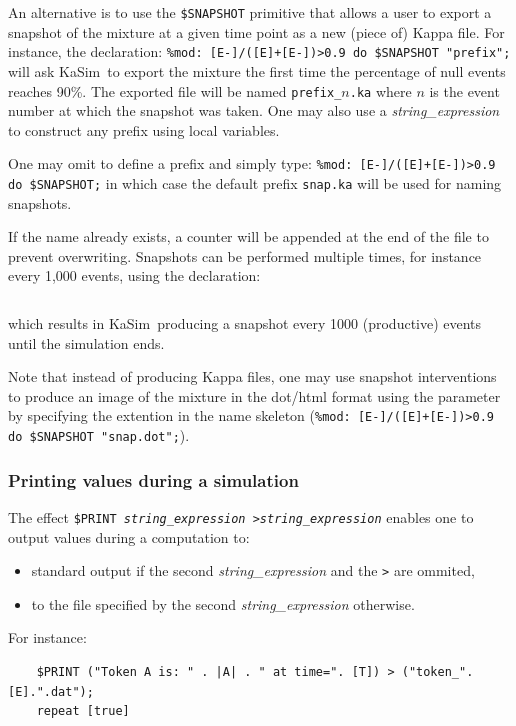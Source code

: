 \documentclass[11pt]{book}
\def\KaSim{\textsf{KaSim}}
\def\ttt#1{\texttt{#1}}
\begin{document}
An alternative is to use the \ttt{\$SNAPSHOT} primitive
that allows a user to export a snapshot of the mixture
at a given time point as a new (piece of) Kappa file.  For instance,
the declaration:
\lstinline[language=kappa]*%mod: [E-]/([E]+[E-])>0.9 do $SNAPSHOT "prefix";*
will ask \KaSim~to export
the mixture the first time the percentage of null
events reaches 90\%. The exported file will be named
\ttt{prefix\_$n$.ka} where $n$ is the event number at which the
snapshot was taken. One may also use a \textit{string\_expression} to
construct any prefix using local variables.

One may omit to define a prefix and simply type:
\lstinline[language=kappa]!%mod: [E-]/([E]+[E-])>0.9 do $SNAPSHOT;!
in which case the default prefix \ttt{snap.ka} will be used for naming snapshots.

If the name already exists, a counter will be appended at the end of
the file to prevent overwriting. Snapshots can be performed multiple
times, for instance every 1,000 events, using the
declaration:
\begin{lstlisting}[language=kappa]
%mod: ([E] [mod] 1000)=0 do $SNAPSHOT "abc.ka"; repeat [true]
\end{lstlisting}
which results in \KaSim~producing a snapshot every 1000 (productive) events until the simulation ends.

Note that instead of producing Kappa files, one may use snapshot
interventions to produce an image of the mixture in the
dot/html format using the parameter by specifying the extention in the
name skeleton
(\lstinline[language=kappa]!%mod: [E-]/([E]+[E-])>0.9 do $SNAPSHOT "snap.dot";!).

\subsubsection{Printing values during a simulation}
The effect \ttt{\$PRINT \textit{string\_expression}
   >\textit{string\_expression}} enables one to output values during a
computation to:
\begin{itemize}
\item standard output if the second \textit{string\_expression} and
  the \ttt{>} are ommited,
\item to the file specified by the second \textit{string\_expression} otherwise.
\end{itemize}
For instance:
\begin{lstlisting}[language=kappa]
%mod: |A|<0 do
    $PRINT ("Token A is: " . |A| . " at time=". [T]) > ("token_".[E].".dat");
    repeat [true]
\end{lstlisting}
\end{document}
